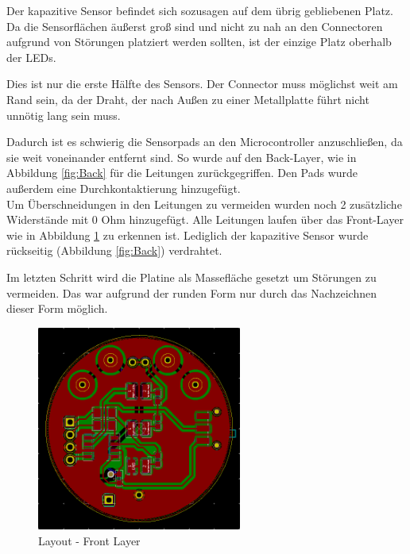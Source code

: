 \documentclass[a4paper,
DIV=13,
12pt,
BCOR=10mm,
department=FakEI,
parskip=half,
automark,
]{article}
\begin{document}
Der kapazitive Sensor befindet sich sozusagen auf dem übrig gebliebenen Platz. Da die Sensorflächen äußerst groß sind und nicht zu nah an den Connectoren aufgrund von Störungen platziert werden sollten, ist der einzige Platz oberhalb der LEDs. 

Dies ist nur die erste Hälfte des Sensors. Der Connector muss möglichst weit am Rand sein, da der Draht, der nach Außen zu einer Metallplatte führt nicht unnötig lang sein muss. 

Dadurch ist es schwierig die Sensorpads an den Microcontroller anzuschließen, da sie weit voneinander entfernt sind. So wurde auf den Back-Layer, wie in Abbildung \ref{fig:Back} für die Leitungen zurückgegriffen. Den Pads wurde außerdem eine Durchkontaktierung hinzugefügt.\\


Um Überschneidungen in den Leitungen zu vermeiden wurden noch 2 zusätzliche Widerstände mit 0 Ohm hinzugefügt. Alle Leitungen laufen über das Front-Layer wie in Abbildung \ref{fig:Front} zu erkennen ist. Lediglich der kapazitive Sensor wurde rückseitig (Abbildung \ref{fig:Back}) verdrahtet. 

Im letzten Schritt wird die Platine als Massefläche gesetzt um Störungen zu vermeiden. Das war aufgrund der runden Form nur durch das Nachzeichnen dieser Form möglich. 

\begin{figure}[!hbpt]
 \begin{center}\includegraphics[width=0.6\textwidth]{Layout_Front.png}
 \caption{Layout - Front Layer}
 \label{fig:Front}
 \end{center}
\end{figure}
\end{document}
